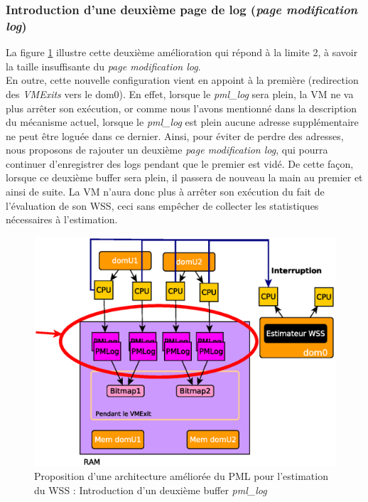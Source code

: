 \subsubsection{Introduction d'une deuxième page de log (\textit{page modification log})}

La figure \ref{fig:double_log} illustre cette deuxième amélioration qui répond à la limite 2, à savoir la taille insuffisante du \textit{page modification log}.\\
En outre, cette nouvelle configuration vient en appoint à la première (redirection des \textit{VMExits} vers le dom0). En effet, lorsque le \textit{pml\_log} sera plein, la VM ne va plus arrêter son exécution, or comme nous l'avons mentionné dans la description du mécanisme actuel, lorsque le \textit{pml\_log} est plein aucune adresse supplémentaire ne peut être loguée dans ce dernier. Ainsi, pour éviter de perdre des adresses, nous proposons de rajouter un deuxième \textit{page modification log}, qui pourra continuer d'enregistrer des logs pendant que le premier est vidé. De cette façon, lorsque ce deuxième buffer sera plein, il passera de nouveau la main au premier et ainsi de suite. La VM n'aura donc plus à arrêter son exécution du fait de l'évaluation de son WSS, ceci sans empêcher de collecter les statistiques nécessaires à l'estimation.

\begin{figure}[H]
    \centering
    \includegraphics[scale=.7]{chapters/3/fig3/PMLOverview2}
    \caption{Proposition d'une architecture améliorée du PML pour l'estimation du WSS : Introduction d'un deuxième buffer \textit{pml\_log}}
    \label{fig:double_log}
\end{figure}

